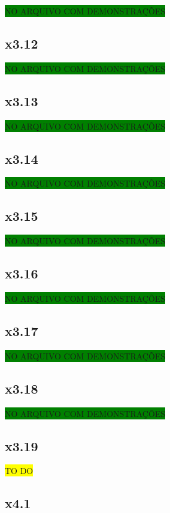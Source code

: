\documentclass[portuguese,a4paper,12pt]{article}
\begin{document}
	\colorbox{green}{NO ARQUIVO COM DEMONSTRAÇÕES}
	
	\subsection*{x3.12}
	
	\colorbox{green}{NO ARQUIVO COM DEMONSTRAÇÕES}
	
	\subsection*{x3.13}
	
	\colorbox{green}{NO ARQUIVO COM DEMONSTRAÇÕES}
	
	\subsection*{x3.14}
	
	\colorbox{green}{NO ARQUIVO COM DEMONSTRAÇÕES}
	
	\subsection*{x3.15}
	
	\colorbox{green}{NO ARQUIVO COM DEMONSTRAÇÕES}
	
	\subsection*{x3.16}
	
	\colorbox{green}{NO ARQUIVO COM DEMONSTRAÇÕES}
	
	\subsection*{x3.17}
	
	\colorbox{green}{NO ARQUIVO COM DEMONSTRAÇÕES}
	
	\subsection*{x3.18}
	
	\colorbox{green}{NO ARQUIVO COM DEMONSTRAÇÕES}
	
	\subsection*{x3.19}
	
	\colorbox{yellow}{TO DO}
	
	\subsection*{x4.1}
	
\end{document}
